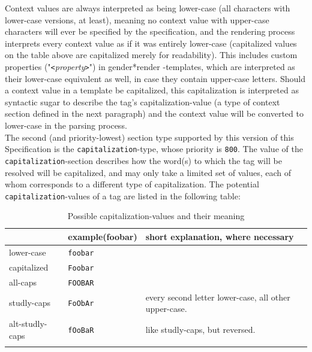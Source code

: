 \documentclass{article}
\newcommand{\GenderRender}{
    gender*render
}
\begin{document}
    Context values are always interpreted as being lower-case (all characters with lower-case versions, at least), meaning no context value with upper-case characters will ever be specified by the specification, and the rendering process interprets every context value as if it was entirely lower-case (capitalized values on the table above are capitalized merely for readability).
    This includes custom properties ("\texttt{<}\emph{property}\texttt{>}") in \GenderRender-templates, which are interpreted as their lower-case equivalent as well, in case they contain upper-case letters.
    Should a context value in a template be capitalized, this capitalization is interpreted as syntactic sugar to describe the tag's capitalization-value (a type of context section defined in the next paragraph) and the context value will be converted to lower-case in the parsing process.\\

    The second (and priority-lowest) section type supported by this version of this Specification is the \texttt{capitalization}-type, whose priority is \texttt{800}.
    The value of the \texttt{capitalization}-section describes how the word(s) to which the tag will be resolved will be capitalized, and may only take a limited set of values, each of whom corresponds to a different type of capitalization.
    The potential \texttt{capitalization}-values of a tag are listed in the following table:

    \begin{flushleft}
        \begin{center}
            \begin{longtable}{| >{\raggedright\arraybackslash}p{7em} | >{\raggedright\arraybackslash}p{4em} | >{\raggedright\arraybackslash}p{23em} |}
                \hline
                {value} & {example\linebreak (foobar)} & {short explanation, where necessary} \\
                \hline\hline
                lower-case & \texttt{foobar} & \\
                \hline
                capitalized & \texttt{Foobar} & \\
                \hline
                all-caps & \texttt{FOOBAR} & \\
                \hline
                studly-caps & \texttt{FoObAr} & every second letter lower-case, all other upper-case.\\
                \hline
                alt-studly-caps & \texttt{fOoBaR} & like studly-caps, but reversed.\\
                \hline
                \caption{Possible capitalization-values and their meaning}
            \end{longtable}
        \end{center}
    \end{flushleft}
\end{document}
